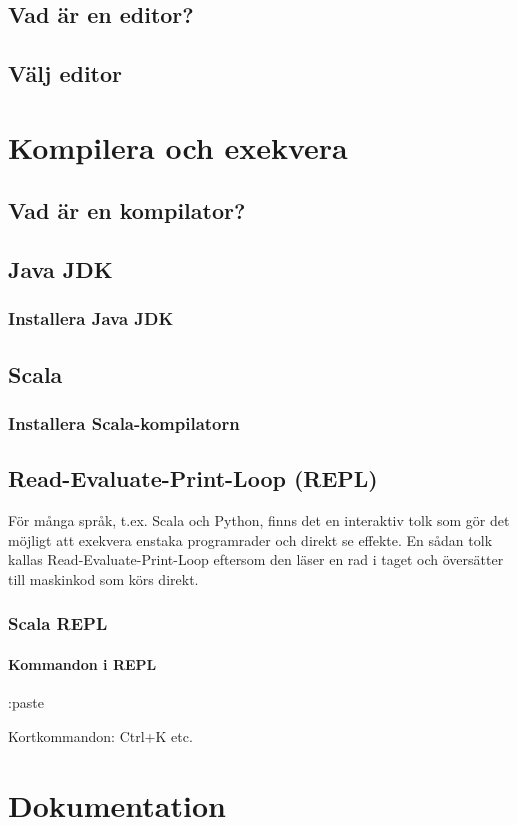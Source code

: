 \documentclass[a4paper]{compendium}
\begin{document}
\section{Vad är en editor?}
\section{Välj editor}

\chapter{Kompilera och exekvera}
\section{Vad är en kompilator?}
\section{Java JDK}
\subsection{Installera Java JDK}
\section{Scala}
\subsection{Installera Scala-kompilatorn}
\section{Read-Evaluate-Print-Loop (REPL)}
För många språk, t.ex. Scala och Python, finns det en interaktiv tolk som gör det möjligt att exekvera enstaka programrader och direkt se effekte. En sådan tolk kallas Read-Evaluate-Print-Loop eftersom den läser en rad i taget och översätter till maskinkod som körs direkt.    
\subsection{Scala REPL}
\subsubsection{Kommandon i REPL}
:paste

Kortkommandon: Ctrl+K etc.

\chapter{Dokumentation}
\end{document}
